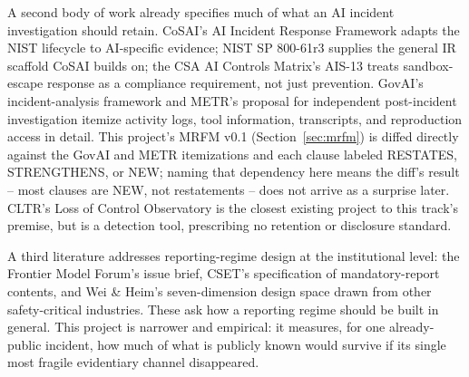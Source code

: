 A second body of work already specifies much of what an AI incident
investigation should retain. CoSAI's AI Incident Response Framework adapts
the NIST lifecycle to AI-specific evidence; NIST SP 800-61r3 supplies the
general IR scaffold CoSAI builds on; the CSA AI Controls Matrix's AIS-13
treats sandbox-escape response as a compliance requirement, not just
prevention. GovAI's incident-analysis framework and METR's proposal for
independent post-incident investigation itemize activity logs, tool
information, transcripts, and reproduction access in detail. This project's
MRFM v0.1 (Section~\ref{sec:mrfm}) is diffed directly against the GovAI and
METR itemizations and each clause labeled RESTATES, STRENGTHENS, or NEW;
naming that dependency here means the diff's result -- most clauses are NEW,
not restatements -- does not arrive as a surprise later. CLTR's Loss of
Control Observatory is the closest existing project to this track's premise,
but is a detection tool, prescribing no retention or disclosure standard.

A third literature addresses reporting-regime design at the institutional
level: the Frontier Model Forum's issue brief, CSET's specification of
mandatory-report contents, and Wei \& Heim's seven-dimension design space
drawn from other safety-critical industries. These ask how a reporting
regime should be built in general. This project is narrower and empirical:
it measures, for one already-public incident, how much of what is publicly
known would survive if its single most fragile evidentiary channel
disappeared.

